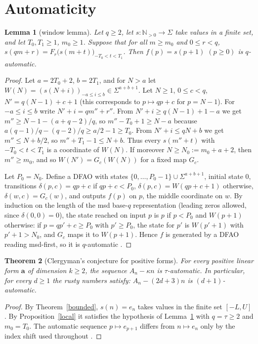 \documentclass[11pt]{article}
\newtheorem{theorem}{Theorem}\newtheorem{lemma}[theorem]{Lemma}\newtheorem{proposition}[theorem]{Proposition}\newtheorem{corollary}[theorem]{Corollary}
\theoremstyle{remark}\newtheorem{remark}[theorem]{Remark}
\theoremstyle{definition}\newtheorem{definition}[theorem]{Definition}
\newcommand{\N}{\mathbb{N}}
\begin{document}
\section{Automaticity}
\begin{lemma}[window lemma]\label{window}
Let \(q\ge2\), let \(s:\N_{>0}\to\Sigma\) take values in a finite set, and let \(T_0,T_1\ge1\), \(m_0\ge1\). Suppose that for all \(m\ge m_0\) and \(0\le r<q\),
\(s(qm+r)=F_r\bigl(s(m+t)\bigr)_{-T_0<t<T_1}\). Then \(f(p)=s(p+1)\) \((p\ge0)\) is \(q\)-automatic.
\end{lemma}
\begin{proof}
Let \(a=2T_0+2\), \(b=2T_1\), and for \(N>a\) let \(W(N)=(s(N+i))_{-a\le i\le b}\in\Sigma^{a+b+1}\).
Let \(N\ge1\), \(0\le c<q\), \(N'=q(N-1)+c+1\) (this corresponds to \(p\mapsto qp+c\) for \(p=N-1\)). For \(-a\le i\le b\) write \(N'+i=qm''+r''\).
From \(N'+i\ge q(N-1)+1-a\) we get \(m''\ge N-1-(a+q-2)/q\), so \(m''-T_0+1\ge N-a\) because \(a(q-1)/q-(q-2)/q\ge a/2-1\ge T_0\).
From \(N'+i\le qN+b\) we get \(m''\le N+b/2\), so \(m''+T_1-1\le N+b\).
Thus every \(s(m''+t)\) with \(-T_0<t<T_1\) is a coordinate of \(W(N)\). If moreover \(N\ge N_0:=m_0+a+2\), then \(m''\ge m_0\), and so \(W(N')=G_c(W(N))\) for a fixed map \(G_c\).

Let \(P_0=N_0\). Define a DFAO with states \(\{0,\dots,P_0-1\}\cup\Sigma^{a+b+1}\), initial state \(0\), transitions \(\delta(p,c)=qp+c\) if \(qp+c<P_0\), \(\delta(p,c)=W(qp+c+1)\) otherwise, \(\delta(w,c)=G_c(w)\), and outputs \(f(p)\) on \(p\), the middle coordinate on \(w\). By induction on the length of the msd base-\(q\) representation (leading zeros allowed, since \(\delta(0,0)=0\)), the state reached on input \(p\) is \(p\) if \(p<P_0\) and \(W(p+1)\) otherwise: if \(p=qp'+c\ge P_0\) with \(p'\ge P_0\), the state for \(p'\) is \(W(p'+1)\) with \(p'+1>N_0\), and \(G_c\) maps it to \(W(p+1)\). Hence \(f\) is generated by a DFAO reading msd-first, so it is \(q\)-automatic \cite[Thm.~5.2.3]{as}.
\end{proof}

\begin{theorem}[Clergyman's conjecture for positive forms]\label{main}
For every positive linear form \(\mathbf a\) of dimension \(k\ge2\), the sequence \(A_n-\kappa n\) is \(\tau\)-automatic. In particular, for every \(d\ge1\) the rusty numbers satisfy: \(A_n-(2d+3)n\) is \((d+1)\)-automatic.
\end{theorem}
\begin{proof}
By Theorem~\ref{bounded}, \(s(n)=e_n\) takes values in the finite set \([-L,U]\). By Proposition~\ref{local} it satisfies the hypothesis of Lemma~\ref{window} with \(q=\tau\ge2\) and \(m_0=T_0\). The automatic sequence \(p\mapsto e_{p+1}\) differs from \(n\mapsto e_n\) only by the index shift used throughout \cite{fj}.
\end{proof}
\end{document}
